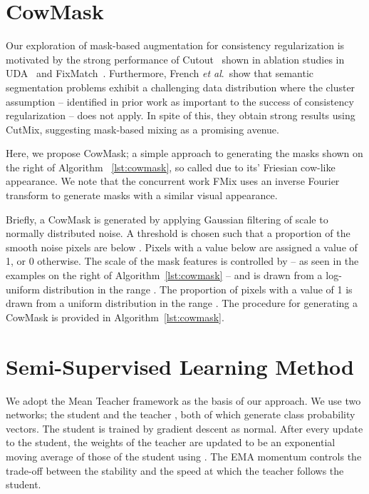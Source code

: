 \documentclass{article}
\newcommand{\etal}{\textit{et al}.}
\begin{document}
\section{CowMask}
\label{sec:cowmask}

Our exploration of mask-based augmentation for consistency regularization is motivated by the strong performance
of Cutout~\cite{Devries:Cutout} shown in ablation studies in UDA~\cite{Xie:UDA} and FixMatch~\cite{Sohn:FixMatch}.
Furthermore, French \etal~show that semantic segmentation problems exhibit a challenging data distribution where
the cluster assumption -- identified in prior work \cite{Luo:SNTG,Sajjadi:Mutual,Shu:DIRTT,Verma:ICT} as important to the success of consistency regularization -- does not apply. In spite of this, they
obtain strong results using CutMix, suggesting mask-based mixing as a promising avenue.

Here, we propose CowMask; a simple approach to generating the masks shown on the right of Algorithm ~\ref{lst:cowmask}, so called due to its' Friesian cow-like appearance.
We note that the concurrent work FMix \cite{Harris:FMix} uses an inverse Fourier transform to generate masks with a similar visual appearance.

Briefly, a CowMask is generated by applying Gaussian filtering of scale  to normally distributed noise.
A threshold  is chosen such that a proportion  of the smooth noise pixels are below .
Pixels with a value below  are assigned a value of 1, or 0 otherwise.
The scale of the mask features is controlled by  -- as seen in the examples on the right of Algorithm~\ref{lst:cowmask} -- and is drawn from a log-uniform distribution in
the range . The proportion  of pixels with a value of 1 is drawn from
a uniform distribution in the range . The procedure for generating a CowMask is provided in Algorithm~\ref{lst:cowmask}.









\section{Semi-Supervised Learning Method}
\label{sec:approach}
We adopt the Mean Teacher\cite{Tarvainen:MeanTeachers} framework as the basis of our approach.
We use two networks; the student  and the teacher ,
both of which generate class probability vectors.
The student is trained by gradient descent as normal.
After every update to the student, the weights of the teacher are updated to be an exponential moving average of those of the student using .
The EMA momentum  controls the trade-off between the stability and the speed at which the teacher follows the student.
\end{document}
